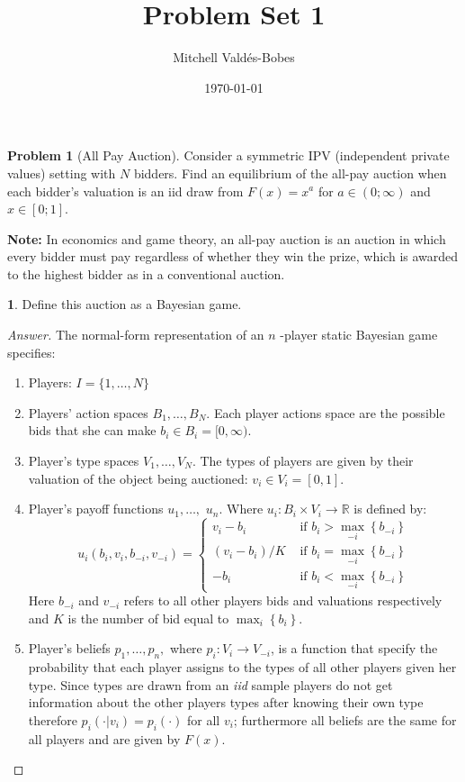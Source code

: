 \documentclass[12pt]{article}
\title{Problem Set 1}
\author{Mitchell Valdés-Bobes}
\date{\today}
\theoremstyle{definition}
\newtheorem{problem}{Problem}
\newtheorem{subproblem}{}[problem]
\begin{document}
\maketitle

\begin{problem}[All Pay Auction]
Consider a symmetric IPV (independent private values) setting with $N$ bidders. Find an equilibrium of the all-pay auction when each bidder's valuation is an iid draw from $F(x)=x^{a}$ for $a \in(0 ; \infty)$ and $x \in[0 ; 1]$.

\textbf{Note:} In economics and game theory, an all-pay auction is an auction in which every bidder must pay regardless of whether they win the prize, which is awarded to the highest bidder as in a conventional auction. 
\begin{subproblem}
Define this auction as a Bayesian game.
\end{subproblem}

\begin{proof}[Answer]
The normal-form representation of an $n$ -player static Bayesian game specifies:
\begin{enumerate}
    \item Players: $I = \{1,\ldots,N\}$
    \item Players' action spaces $B_{1}, \ldots, B_{N}$. Each player actions space are the possible bids that she can make $b_i\in B_i=[0, \infty)$.
    \item Player's type spaces $V_{1}, \ldots, V_{N}$. The types of players are given by their valuation of the object being auctioned: $v_i\in V_i=[0,1]$.
    \item Player's payoff functions $u_{1}, \ldots,$ $u_{n} .$ Where $u_i:B_i\times V_i \to\mathbb{R}$ is defined by:
    $$u_{i}\left(b_{i}, v_{i}, b_{-i}, v_{-i}\right)=\left\{\begin{array}{ll}
v_{i}-b_{i} & \text { if } b_{i}>\max_{-i}\left\{b_{-i}\right\} \\
\left(v_{i}-b_{i}\right) / K & \text { if } b_{i}=\max_{-i}\left\{b_{-i}\right\} \\
-b_{i} & \text { if } b_{i}<\max_{-i}\left\{b_{-i}\right\}
\end{array}\right.$$
Here $b_{-i}$ and $v_{-i}$ refers to all other players bids and valuations respectively and $K$ is the number of bid equal to $\max_{i}\left\{b_{i}\right\}$.
    \item Player's beliefs $p_{1}, \ldots, p_{n},$ where $p_i:V_i\to V_{-i}$, is a function that specify the probability that each player assigns to the types of all other players given her type. Since types are drawn from an \textit{iid} sample players do not get information about the other players types after knowing their own type therefore $p_{i}(\cdot|v_i)=p_i(\cdot)$ for all $v_i$; furthermore all beliefs are the same for all players and are given by $F(x)$. 
\end{enumerate}
\end{proof}


\end{problem}
\end{document}
